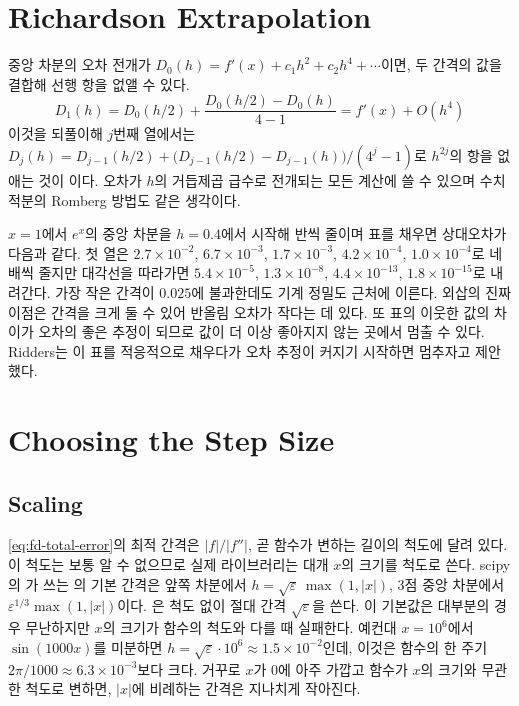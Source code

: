 \section{Richardson Extrapolation}
\label{sec:richardson}

중앙 차분의 오차 전개가 $D_0(h)=f'(x)+c_1h^2+c_2h^4+\cdots$이면, 두 간격의 값을 결합해 선행 항을 없앨 수 있다.
\[
D_1(h)=D_0(h/2)+\frac{D_0(h/2)-D_0(h)}{4-1}=f'(x)+O(h^4)
\]
이것을 되풀이해 $j$번째 열에서는 $D_j(h)=D_{j-1}(h/2)+\bigl(D_{j-1}(h/2)-D_{j-1}(h)\bigr)/(4^j-1)$로 $h^{2j}$의 항을 없애는 것이 이다\cite{richardson1911,richardson1927}. 오차가 $h$의 거듭제곱 급수로 전개되는 모든 계산에 쓸 수 있으며 수치 적분의 Romberg 방법도 같은 생각이다.

$x=1$에서 $e^x$의 중앙 차분을 $h=0.4$에서 시작해 반씩 줄이며 표를 채우면 상대오차가 다음과 같다. 첫 열은 $2.7\times10^{-2}$, $6.7\times10^{-3}$, $1.7\times10^{-3}$, $4.2\times10^{-4}$, $1.0\times10^{-4}$로 네 배씩 줄지만 대각선을 따라가면 $5.4\times10^{-5}$, $1.3\times10^{-8}$, $4.4\times10^{-13}$, $1.8\times10^{-15}$로 내려간다. 가장 작은 간격이 $0.025$에 불과한데도 기계 정밀도 근처에 이른다. 외삽의 진짜 이점은 간격을 크게 둘 수 있어 반올림 오차가 작다는 데 있다. 또 표의 이웃한 값의 차이가 오차의 좋은 추정이 되므로 값이 더 이상 좋아지지 않는 곳에서 멈출 수 있다. Ridders는 이 표를 적응적으로 채우다가 오차 추정이 커지기 시작하면 멈추자고 제안했다\cite{ridders1982}.

\section{Choosing the Step Size}
\label{sec:step-choice}

\subsection{Scaling}

\eqref{eq:fd-total-error}의 최적 간격은 $|f|/|f''|$, 곧 함수가 변하는 길이의 척도에 달려 있다. 이 척도는 보통 알 수 없으므로 실제 라이브러리는 대개 $x$의 크기를 척도로 쓴다. scipy의 가 쓰는 의 기본 간격은 앞쪽 차분에서 $h=\sqrt\varepsilon\,\max(1,|x|)$, 3점 중앙 차분에서 $\varepsilon^{1/3}\max(1,|x|)$이다. 은 척도 없이 절대 간격 $\sqrt\varepsilon$을 쓴다. 이 기본값은 대부분의 경우 무난하지만 $x$의 크기가 함수의 척도와 다를 때 실패한다. 예컨대 $x=10^6$에서 $\sin(1000x)$를 미분하면 $h=\sqrt\varepsilon\cdot10^6\approx1.5\times10^{-2}$인데, 이것은 함수의 한 주기 $2\pi/1000\approx6.3\times10^{-3}$보다 크다. 거꾸로 $x$가 $0$에 아주 가깝고 함수가 $x$의 크기와 무관한 척도로 변하면, $|x|$에 비례하는 간격은 지나치게 작아진다.

